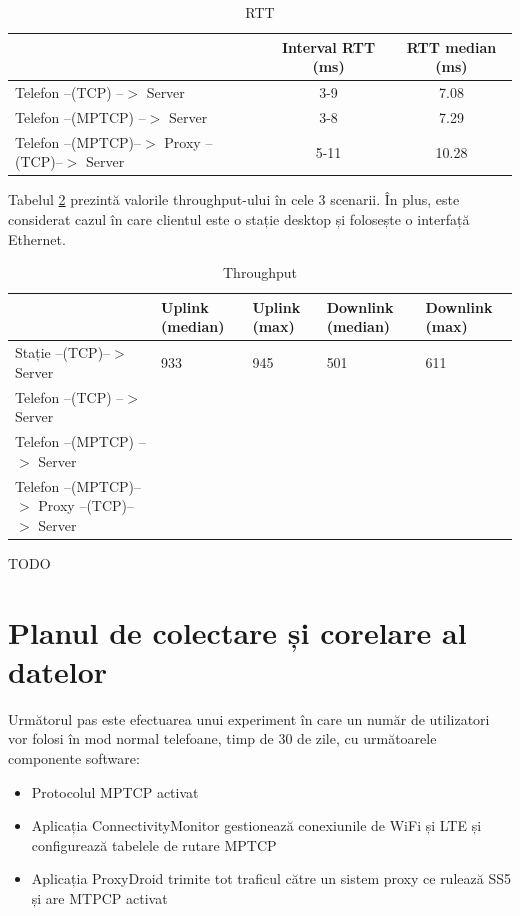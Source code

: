 \begin{table}[h]
\centering
\caption{RTT}
\label{tab:rtt}
\begin{tabular}{l | c c}
\hline
& Interval RTT (ms)  & RTT median (ms) \\
\hline
Telefon --(TCP) --$>$ Server  & 3-9 &  7.08  \\
Telefon --(MPTCP) --$>$ Server  & 3-8  & 7.29 \\
Telefon --(MPTCP)--$>$ Proxy --(TCP)--$>$ Server & 5-11  & 10.28 \\
\hline
\end{tabular}
\end{table}

Tabelul \ref{tab:throughput} prezintă valorile throughput-ului în cele 3 scenarii. În plus, este considerat cazul în care clientul este o stație desktop și folosește o interfață Ethernet.

\begin{table}[h]
\centering
\caption{Throughput}
\label{tab:throughput}
\begin{tabular}{l | p{1.5cm} p{1.5cm} p{1.5cm} p{1.5cm}}
\hline
& Uplink (median) & Uplink (max) & Downlink (median) & Downlink (max) \\
\hline
Stație --(TCP)--$>$ Server & 933 & 945 & 501 & 611 \\
Telefon --(TCP) --$>$ Server & & & & \\
Telefon --(MPTCP) --$>$ Server & & & & \\
Telefon --(MPTCP)--$>$ Proxy --(TCP)--$>$ Server & & & & \\
\hline
\end{tabular}
\end{table}

TODO

\section{Planul de colectare și corelare al datelor}

Următorul pas este efectuarea unui experiment în care un număr de utilizatori vor folosi în mod normal telefoane, timp de 30 de zile, cu următoarele componente software:
\begin{itemize}
	\item Protocolul MPTCP activat
	\item Aplicația ConnectivityMonitor gestionează conexiunile de WiFi și LTE și configurează tabelele de rutare MPTCP
	\item Aplicația ProxyDroid trimite tot traficul către un sistem proxy ce rulează SS5 și are MTPCP activat 
\end{itemize}

